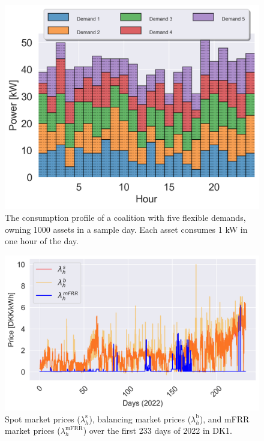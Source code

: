 \documentclass[conference]{IEEEtran}
\begin{document}

\begin{figure}[!t]
    \centering
    \includegraphics[width=\columnwidth]{figures/assets2.png}
    \caption{The consumption profile of a coalition with five flexible demands, owning 1000 assets in a sample day. Each asset consumes 1 kW in one hour of the day.}
    \label{fig:assets}
\end{figure}

\begin{figure}[t]
    \centering
    \includegraphics[width=\columnwidth]{figures/prices.png}
    \caption{Spot market prices ($\lambda^{\text{s}}_h$), balancing market prices ($\lambda^{\text{b}}_h$), and mFRR market prices ($\lambda^{\text{mFRR}}_h$)  over the first 233 days of 2022 in DK1.}
    \label{fig:prices}
\end{figure}
\end{document}

